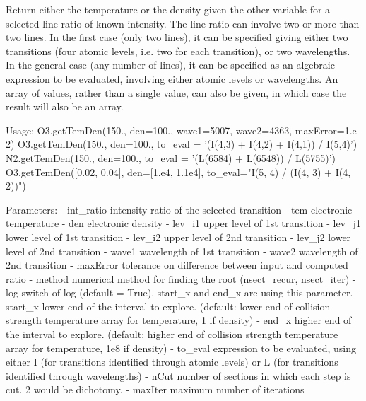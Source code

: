 \begin{DoxyVerb}Return either the temperature or the density given the other variable for a selected line ratio 
    of known intensity.
The line ratio can involve two or more than two lines. 
In the first case (only two lines), it can be specified giving either two transitions 
    (four atomic levels, i.e. two for each transition), or two wavelengths.
In the general case (any number of lines), it can be specified as an algebraic expression 
    to be evaluated, involving either atomic levels or wavelengths.
An array of values, rather than a single value, can also be given, in which case the result 
    will also be an array.
    
Usage: 
    O3.getTemDen(150., den=100., wave1=5007, wave2=4363, maxError=1.e-2)
    O3.getTemDen(150., den=100., to_eval = '(I(4,3) + I(4,2) + I(4,1)) / I(5,4)')
    N2.getTemDen(150., den=100., to_eval = '(L(6584) + L(6548)) / L(5755)')
    O3.getTemDen([0.02, 0.04], den=[1.e4, 1.1e4], to_eval="I(5, 4) / (I(4, 3) + I(4, 2))")

Parameters:
    - int_ratio    intensity ratio of the selected transition
    - tem          electronic temperature
    - den          electronic density
    - lev_i1       upper level of 1st transition
    - lev_j1       lower level of 1st transition
    - lev_i2       upper level of 2nd transition
    - lev_j2       lower level of 2nd transition
    - wave1        wavelength of 1st transition
    - wave2        wavelength of 2nd transition
    - maxError     tolerance on difference between input and computed ratio 
    - method       numerical method for finding the root (nsect_recur, nsect_iter)
    - log          switch of log (default = True). start_x and end_x are using this parameter.
    - start_x      lower end of the interval to explore. (default: lower end of collision 
            strength temperature array for temperature, 1 if density)
    - end_x        higher end of the interval to explore. (default: higher end of collision 
            strength temperature array for temperature, 1e8 if density)
    - to_eval      expression to be evaluated, using either I (for transitions identified 
            through atomic levels) or L (for transitions identified through wavelengths)
    - nCut        number of sections in which each step is cut. 2 would be dichotomy.
    - maxIter     maximum number of iterations\end{DoxyVerb}
